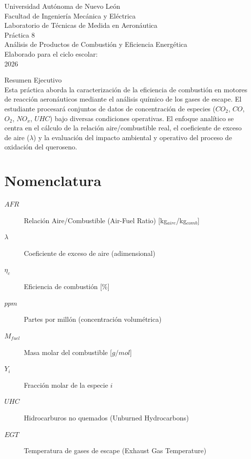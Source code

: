 \documentclass[11pt, a4paper]{article}
\begin{document}
\begin{titlepage}
    \centering
    {\LARGE Universidad Autónoma de Nuevo León}\\[0.5cm]
    {\Large Facultad de Ingeniería Mecánica y Eléctrica}\\[2cm]
    
    {\Large Laboratorio de Técnicas de Medida en Aeronáutica}\\[1cm]
    
    {\Huge Práctica 8}\\[0.5cm]
    {\Large Análisis de Productos de Combustión y Eficiencia Energética}\\[2cm]
    
    Elaborado para el ciclo escolar:\\
    2026\\[2cm]
    
    \vfill
    
    Resumen Ejecutivo\\
    Esta práctica aborda la caracterización de la eficiencia de combustión en motores de reacción aeronáuticos mediante el análisis químico de los gases de escape. El estudiante procesará conjuntos de datos de concentración de especies ($CO_2$, $CO$, $O_2$, $NO_x$, $UHC$) bajo diversas condiciones operativas. El enfoque analítico se centra en el cálculo de la relación aire/combustible real, el coeficiente de exceso de aire ($\lambda$) y la evaluación del impacto ambiental y operativo del proceso de oxidación del queroseno.
\end{titlepage}

\tableofcontents
\newpage

\section*{Nomenclatura}
\begin{description}
    \item[$AFR$] Relación Aire/Combustible (Air-Fuel Ratio) [kg$_{aire}$/kg$_{comb}$]
    \item[$\lambda$] Coeficiente de exceso de aire (adimensional)
    \item[$\eta_c$] Eficiencia de combustión [\%]
    \item[$ppm$] Partes por millón (concentración volumétrica)
    \item[$M_{fuel}$] Masa molar del combustible [$g/mol$]
    \item[$Y_i$] Fracción molar de la especie $i$
    \item[$UHC$] Hidrocarburos no quemados (Unburned Hydrocarbons)
    \item[$EGT$] Temperatura de gases de escape (Exhaust Gas Temperature)
\end{description}
\end{document}
